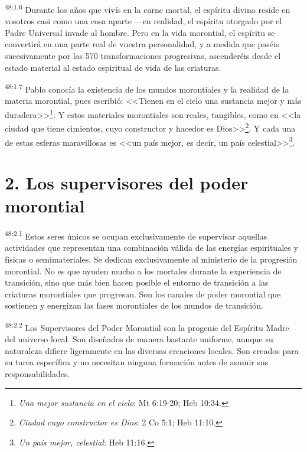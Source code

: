 \par
\textsuperscript{48:1.6} Durante los años que vivís en la carne mortal, el espíritu divino reside en vosotros casi como una cosa aparte ---en realidad, el espíritu otorgado por el Padre Universal invade al hombre. Pero en la vida morontial, el espíritu se convertirá en una parte real de vuestra personalidad, y a medida que paséis sucesivamente por las 570 transformaciones progresivas, ascenderéis desde el estado material al estado espiritual de vida de las criaturas.

\par
\textsuperscript{48:1.7} Pablo conocía la existencia de los mundos morontiales y la realidad de la materia morontial, pues escribió: <<Tienen en el cielo una sustancia mejor y más duradera>>\footnote{\textit{Una mejor sustancia en el cielo}: Mt 6:19-20; Heb 10:34.}. Y estos materiales morontiales son reales, tangibles, como en <<la ciudad que tiene cimientos, cuyo constructor y hacedor es Dios>>\footnote{\textit{Ciudad cuyo constructor es Dios}: 2 Co 5:1; Heb 11:10.}. Y cada una de estas esferas maravillosas es <<un país mejor, es decir, un país celestial>>\footnote{\textit{Un país mejor, celestial}: Heb 11:16.}.

\section*{2. Los supervisores del poder morontial}
\par
\textsuperscript{48:2.1} Estos seres únicos se ocupan exclusivamente de supervisar aquellas actividades que representan una combinación válida de las energías espirituales y físicas o semimateriales. Se dedican exclusivamente al ministerio de la progresión morontial. No es que ayuden mucho a los mortales durante la experiencia de transición, sino que más bien hacen posible el entorno de transición a las criaturas morontiales que progresan. Son los canales de poder morontial que sostienen y energizan las fases morontiales de los mundos de transición.

\par
\textsuperscript{48:2.2} Los Supervisores del Poder Morontial son la progenie del Espíritu Madre del universo local. Son diseñados de manera bastante uniforme, aunque su naturaleza difiere ligeramente en las diversas creaciones locales. Son creados para su tarea específica y no necesitan ninguna formación antes de asumir sus responsabilidades.

